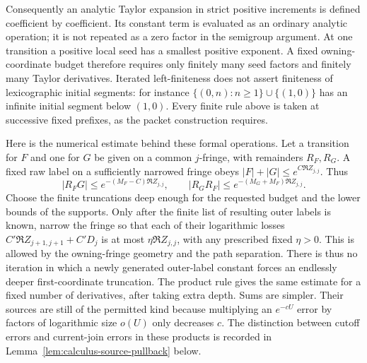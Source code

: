 Consequently an analytic Taylor expansion in strict positive increments is
defined coefficient by coefficient.  Its constant term is evaluated as an
ordinary analytic operation; it is not repeated as a zero factor in the
semigroup argument.  At one transition a positive local seed has a smallest
positive exponent.  A fixed owning-coordinate budget therefore requires
only finitely many seed factors and finitely many Taylor derivatives.
Iterated left-finiteness does not assert finiteness of lexicographic initial
segments: for instance $\{(0,n):n\ge1\}\cup\{(1,0)\}$ has an infinite
initial segment below $(1,0)$.  Every finite rule above is taken at successive
fixed prefixes, as the packet construction requires.

Here is the numerical estimate behind these formal operations.  Let a
transition for $F$ and one for $G$ be given on a common $j$-fringe, with
remainders $R_F,R_G$.  A fixed raw label on a sufficiently narrowed fringe
obeys $|F|+|G|\le e^{C\Re Z_{j,j}}$.  Thus
\[
 |R_FG|\le e^{-(M_F-C)\Re Z_{j,j}},\qquad
 |R_GR_F|\le e^{-(M_G+M_F)\Re Z_{j,j}}.
\]
Choose the finite truncations deep enough for the requested budget and the
lower bounds of the supports.  Only after the finite list of resulting
outer labels is known, narrow the fringe so that each of their logarithmic
losses $C'\Re Z_{j+1,j+1}+C'D_j$ is at most
$\eta\Re Z_{j,j}$, with any prescribed fixed $\eta>0$.
This is allowed by the owning-fringe geometry and the path separation.
There is thus no iteration in which a newly generated outer-label constant
forces an endlessly deeper first-coordinate truncation.  The product rule
gives the same estimate for a fixed number of derivatives, after taking
extra depth.  Sums are simpler.  Their sources are still of the permitted
kind because multiplying an $e^{-cU}$ error by factors of logarithmic size
$o(U)$ only decreases $c$.
The distinction between cutoff errors and current-join errors in these
products is recorded in Lemma~\ref{lem:calculus-source-pullback} below.


